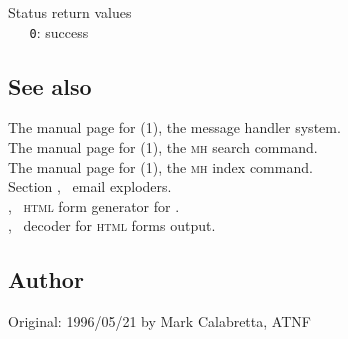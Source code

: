 Status return values
\\ \verb+   0+: success

\subsection*{See also}

The manual page for (1), the message handler system.\\
The manual page for (1), the \textsc{mh} search command.\\
The manual page for (1), the \textsc{mh} index command.\\
Section , \aipspp\ email exploders.\\
, \aipspp\ \textsc{html} form generator for .\\
, \aipspp\ decoder for \textsc{html} forms output.

\subsection*{Author}

Original: 1996/05/21 by Mark Calabretta, ATNF
